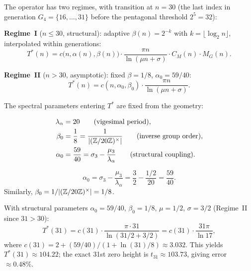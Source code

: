 \begin{Definition}\label{def:Tstar}
The operator has two regimes, with transition at $n = 30$
(the last index in generation $G_4 = \{16,\ldots,31\}$ before the
pentagonal threshold $2^5 = 32$):

\medskip\noindent
\textbf{Regime~I} ($n\le 30$, structural): adaptive $\beta(n) = 2^{-k}$
with $k = \lfloor\log_2 n\rfloor$, interpolated within generations:
\begin{equation}\label{eq:Tstar-regime1}
  T^*(n) = c\bigl(n,\alpha(n),\beta(n)\bigr)\cdot
    \frac{\pi n}{\ln(\mu n + \sigma)}
    \cdot C_M(n)\cdot M_G(n).
\end{equation}

\noindent
\textbf{Regime~II} ($n > 30$, asymptotic): fixed $\beta = 1/8$,
$\alpha_0 = 59/40$:
\begin{equation}\label{eq:Tstar-regime2}
  T^*(n) = c(n,\alpha_0,\beta_0)\cdot
    \frac{\pi n}{\ln(\mu n + \sigma)}.
\end{equation}
\end{Definition}

The spectral parameters entering $T^*$ are fixed from the geometry:
\begin{Definition}\label{def:structural-params}
\begin{align}
  \lambda_\alpha &= 20
    \qquad\text{(vigesimal period)},
    \label{eq:lambda-alpha}  \\
  \beta_0 &= \frac{1}{8} = \frac{1}{|(\mathbb{Z}/20\mathbb{Z})^\times|}
    \qquad\text{(inverse group order)},
    \label{eq:beta0}  \\
  \alpha_0 &= \frac{59}{40}
    = \sigma_3 - \frac{\mu_3}{\lambda_\alpha}
    \qquad\text{(structural coupling)}.
    \label{eq:alpha0}
\end{align}
\end{Definition}

\begin{Remark}\label{rmk:alpha0-structural}
\begin{equation}\label{eq:alpha0-structural}
  \alpha_0 = \sigma_3 - \frac{\mu_3}{\lambda_\alpha}
  = \frac{3}{2} - \frac{1/2}{20} = \frac{59}{40}.
\end{equation}
Similarly, $\beta_0 = 1/|(\mathbb{Z}/20\mathbb{Z})^\times| = 1/8$.
\end{Remark}

\begin{Example}[Evaluation at $n=31$]\label{ex:Tstar-31}
With structural parameters $\alpha_0=59/40$, $\beta_0=1/8$, $\mu=1/2$,
$\sigma=3/2$ (Regime~II since $31>30$):
\begin{equation}\label{eq:Tstar-example}
  T^*(31) = c(31)\cdot\frac{\pi\cdot 31}{\ln(31/2 + 3/2)}
  = c(31)\cdot\frac{31\pi}{\ln 17},
\end{equation}
where $c(31) = 2 + (59/40)/(1 + \ln(31)/8) \approx 3.032$.
This yields $T^*(31)\approx 104.22$; the exact 31st zero height is
$t_{31}\approx 103.73$, giving error $\approx 0.48\%$.
\end{Example}

